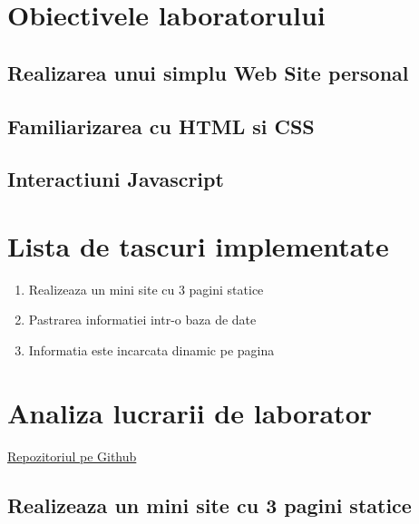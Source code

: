 \documentclass[a4paper, 12pt]{article}
\begin{document}
\section{Obiectivele laboratorului}
\subsection{Realizarea unui simplu Web Site personal}
\subsection{Familiarizarea cu HTML si CSS}
\subsection{Interactiuni Javascript}

\section{Lista de tascuri implementate}
	\begin{enumerate}
	\item Realizeaza un mini site cu 3 pagini statice
	\item Pastrarea  informatiei intr-o baza de date
	\item Informatia este incarcata dinamic pe pagina
	\end{enumerate}

\section{Analiza lucrarii de laborator}
\href{https://github.com/VladislavCrivenco/MIDPS}{Repozitoriul pe Github}

\subsection{Realizeaza un mini site cu 3 pagini statice}
\end{document}
